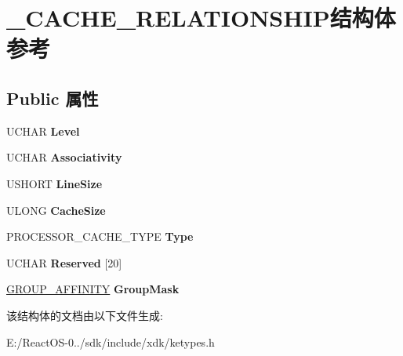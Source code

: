 \hypertarget{struct___c_a_c_h_e___r_e_l_a_t_i_o_n_s_h_i_p}{}\section{\+\_\+\+C\+A\+C\+H\+E\+\_\+\+R\+E\+L\+A\+T\+I\+O\+N\+S\+H\+I\+P结构体 参考}
\label{struct___c_a_c_h_e___r_e_l_a_t_i_o_n_s_h_i_p}
\subsection*{Public 属性}
\begin{DoxyCompactItemize}
\item 
\mbox{\label{struct___c_a_c_h_e___r_e_l_a_t_i_o_n_s_h_i_p_a736cfbc096725b8fe4aa10c9173962af}} 
U\+C\+H\+AR {\bfseries Level}
\item 
\mbox{\label{struct___c_a_c_h_e___r_e_l_a_t_i_o_n_s_h_i_p_abaec48021c5034514796e1093c8447d8}} 
U\+C\+H\+AR {\bfseries Associativity}
\item 
\mbox{\label{struct___c_a_c_h_e___r_e_l_a_t_i_o_n_s_h_i_p_a342da3cd546033fbd64c000bdf4ee806}} 
U\+S\+H\+O\+RT {\bfseries Line\+Size}
\item 
\mbox{\label{struct___c_a_c_h_e___r_e_l_a_t_i_o_n_s_h_i_p_ad3b2135493636b031c02fbd724f00509}} 
U\+L\+O\+NG {\bfseries Cache\+Size}
\item 
\mbox{\label{struct___c_a_c_h_e___r_e_l_a_t_i_o_n_s_h_i_p_a35bd0c01b066aeb1542db76b35fe48e3}} 
P\+R\+O\+C\+E\+S\+S\+O\+R\+\_\+\+C\+A\+C\+H\+E\+\_\+\+T\+Y\+PE {\bfseries Type}
\item 
\mbox{\label{struct___c_a_c_h_e___r_e_l_a_t_i_o_n_s_h_i_p_a3592c0438d018b2e646ae5c7d466090e}} 
U\+C\+H\+AR {\bfseries Reserved} \mbox{[}20\mbox{]}
\item 
\mbox{\label{struct___c_a_c_h_e___r_e_l_a_t_i_o_n_s_h_i_p_a1288dcb22d39bab39a374d4e0358556f}} 
\hyperlink{struct___g_r_o_u_p___a_f_f_i_n_i_t_y}{G\+R\+O\+U\+P\+\_\+\+A\+F\+F\+I\+N\+I\+TY} {\bfseries Group\+Mask}
\end{DoxyCompactItemize}


该结构体的文档由以下文件生成\+:\begin{DoxyCompactItemize}
\item 
E\+:/\+React\+O\+S-\/0../sdk/include/xdk/ketypes.\+h\end{DoxyCompactItemize}
